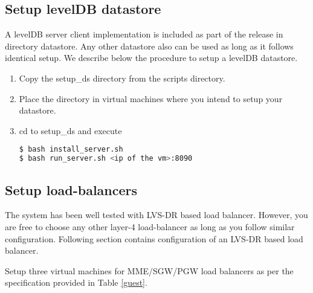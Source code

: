 \pdfminorversion=4\documentclass[hidelinks]{report}
\begin{document}
\subsection*{Setup levelDB datastore}
A levelDB server client implementation is included as part of the release in directory datastore. Any other datastore also can be used as long as it follows identical setup. We describe below the procedure to setup a levelDB datastore. 
\begin{enumerate}
\item Copy the setup\_ds directory from the scripts directory.
\item Place the directory in virtual machines where you intend to setup your datastore. 
\item cd to setup\_ds and execute 
\begin{lstlisting}[language=bash]
$ bash install_server.sh
$ bash run_server.sh <ip of the vm>:8090
\end{lstlisting}
\end{enumerate}

\subsection*{Setup load-balancers}
\label{sds}
The system has been well tested with LVS-DR based load balancer. However, you are free to choose any other layer-4 load-balancer as long as you follow similar configuration. Following section contains configuration of an LVS-DR based load balancer.

Setup three virtual machines for MME/SGW/PGW load balancers as per the specification provided in Table \ref{guest}.
\end{document}

